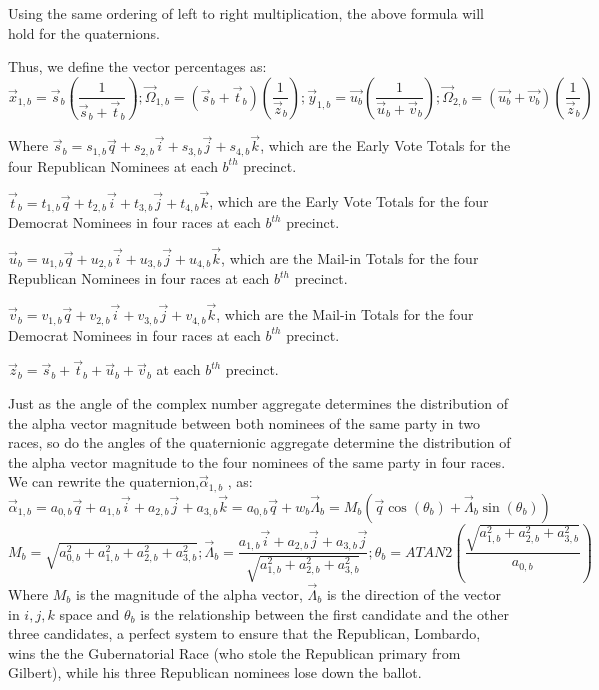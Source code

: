 Using the same ordering of left to right multiplication, the above formula will hold for the quaternions. 

Thus, we define the vector percentages as:
$$\vec{x}_{1,b}=\vec{s}_{b}\left(\frac{1}{\vec{s}_{b}+\vec{t}_{b}}\right); \vec{\Omega}_{1,b}=\left(\vec{s}_{b}+\vec{t}_{b}\right)\left(\frac{1}{\vec{z}_{b}}\right); \vec{y}_{1,b}=\vec{u_{b}}\left(\frac{1}{\vec{u}_{b}+\vec{v}_{b}}\right); \vec{\Omega}_{2,b}=\left(\vec{u_{b}}+\vec{v_{b}}\right)\left(\frac{1}{\vec{z}_{b}}\right)$$

Where $\vec{s}_{b}=s_{1,b}\vec{q}+s_{2,b}\vec{i}+s_{3,b}\vec{j}+s_{4,b}\vec{k}$, which are the Early Vote Totals for the four Republican Nominees at each $b^{th}$ precinct.

$\vec{t}_{b}=t_{1,b}\vec{q}+t_{2,b}\vec{i}+t_{3,b}\vec{j}+t_{4,b}\vec{k}$, which are the Early Vote Totals for the four Democrat Nominees in four races at each $b^{th}$ precinct.

$\vec{u}_{b}=u_{1,b}\vec{q}+u_{2,b}\vec{i}+u_{3,b}\vec{j}+u_{4,b}\vec{k}$, which are the Mail-in Totals for the four Republican Nominees in four races at each $b^{th}$ precinct.

$\vec{v}_{b}=v_{1,b}\vec{q}+v_{2,b}\vec{i}+v_{3,b}\vec{j}+v_{4,b}\vec{k}$, which are the Mail-in Totals for the four Democrat Nominees in four races at each $b^{th}$ precinct.

$\vec{z}_{b}=\vec{s}_{b}+\vec{t}_{b}+\vec{u}_{b}+\vec{v}_{b}$ at each $b^{th}$ precinct.

Just as the angle of the complex number aggregate determines the distribution of the alpha vector magnitude between both nominees of the same party in two races, so do the angles of the quaternionic aggregate determine the distribution of the alpha vector magnitude to the four nominees of the same party in four races.
\newpage
We can rewrite the quaternion,$\vec{\alpha}_{1,b}$ , as:
$$\vec{\alpha}_{1,b}=a_{0,b}\vec{q}+a_{1,b}\vec{i}+a_{2,b}\vec{j}+a_{3,b}\vec{k}=a_{0,b}\vec{q}+w_{b}\vec{\Lambda}_{b}=M_b\left(\vec{q}\cos(\theta_b)+\vec{\Lambda}_{b}\sin(\theta_b)\right)$$
$$M_{b}=\sqrt{a_{0,b}^2+a_{1,b}^2+a_{2,b}^2+a_{3,b}^2}; \vec{\Lambda}_{b}=\frac{a_{1,b}\vec{i}+a_{2,b}\vec{j}+a_{3,b}\vec{j}}{\sqrt{a_{1,b}^2+a_{2,b}^2+a_{3,b}^2}}; \theta_{b}=ATAN2\left(\frac{\sqrt{a_{1,b}^2+a_{2,b}^2+a_{3,b}^2}}{a_{0,b}}\right )$$
Where $M_{b}$ is the magnitude of the alpha vector, $\vec{\Lambda}_{b}$ is the direction of the vector in $i,j,k$ space and $\theta_{b}$ is the relationship between the first candidate and the other three candidates, a perfect system to ensure that the Republican, Lombardo, wins the the Gubernatorial Race (who stole the Republican primary from Gilbert), while his three Republican nominees lose down the ballot.

